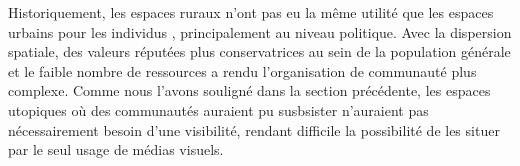 Historiquement, les espaces ruraux n'ont pas eu la même utilité que les espaces urbains pour les individus \lgbt{}, principalement au niveau politique.
Avec la dispersion spatiale, des valeurs réputées plus conservatrices au sein de la population générale et le faible nombre de ressources a rendu l'organisation de communauté \lgbt{} plus complexe.
Comme nous l'avons souligné dans la section précédente, les espaces utopiques où des communautés \lgbt{} auraient pu susbsister n'auraient pas nécessairement besoin d'une visibilité, rendant difficile la possibilité de les situer par le seul usage de médias visuels.



